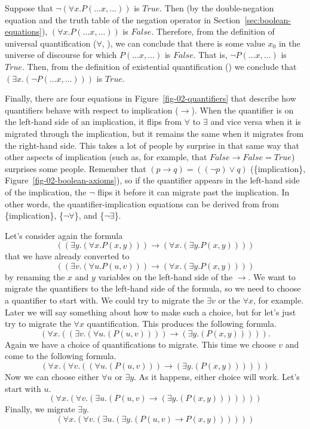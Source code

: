 {Suppose that $\neg(\forall x.P(\dots x, \dots))$ is $True$.
Then (by the double-negation equation and the truth table of the negation operator
in Section~\ref{sec:boolean-equations}),  $(\forall x.P(\dots x, \dots))$ is $False$.
Therefore, from the definition of universal quantification
($\forall$, \pageref{def:universal-quantifier}),
we can conclude that there is some value $x_0$ in the universe of discourse for which
$P(\dots x, \dots)$ is $False$. That is, $\neg P(\dots x, \dots)$ is $True$.
Then, from the definition of existential quantification
(\pageref{def:existential-quantifier})
we conclude that $(\exists x.(\neg P(\dots x, \dots)))$ is $True$.

Finally, there are four equations in Figure~\ref{fig-02-quantifiers} that
describe how quantifiers behave with respect to implication ($\rightarrow$).
When the quantifier is on the left-hand side of an implication, it flips from
$\forall$ to $\exists$ and vice versa when it is migrated through the implication,
but it remains the same when it migrates from the right-hand side.
This takes a lot of people by surprise in that same way that
other aspects of implication (such as, for example, that $False \rightarrow False = True$)
surprises some people.
Remember that $(p \rightarrow q) = ((\neg p) \vee q)$
(\{implication\}, Figure~\ref{fig-02-boolean-axioms}),
so if the quantifier appears in the left-hand side of
the implication, the $\neg$ flips it before it can migrate past the implication.
In other words, the quantifier-implication equations can be derived
from from \{implication\}, \{$\neg\forall$\}, and \{$\neg\exists$\}.

Let's consider again the formula
$$((\exists y.(\forall x.P(x, y))) \rightarrow (\forall x.(\exists y.P(x, y))))$$
that we have already converted to
$$((\exists v.(\forall u.P(u, v))) \rightarrow (\forall x.(\exists y.P(x, y))))$$
by renaming the $x$ and $y$ variables on the left-hand side of the $\rightarrow$.
We want to migrate the quantifiers to the left-hand side of the formula,
so we need to choose a quantifier to start with.
We could try to migrate the $\exists v$ or the $\forall x$, for example.
Later we will say something about how to make such a choice,
but for let's just try to migrate the $\forall x$ quantification.
This produces the following formula.
$$(\forall x.((\exists v.(\forall u.(P(u, v)))) \rightarrow (\exists y.(P(x, y))))).$$
Again we have a choice of quantifications to migrate.
This time we choose $v$ and come to the following formula.
$$(\forall x.(\forall v.((\forall u.(P(u, v))) \rightarrow (\exists y.(P(x, y))))))$$
Now we can choose either $\forall u$ or $\exists y$.
As it happens, either choice will work.
Let's start with $u$.
$$(\forall x.(\forall v.(\exists u.(P(u, v) \rightarrow (\exists y.(P(x, y)))))))$$
Finally, we migrate $\exists y$.
$$(\forall x.(\forall v.(\exists u.(\exists y.(P(u, v) \rightarrow P(x, y))))))$$

}
